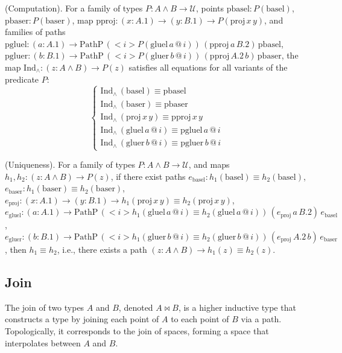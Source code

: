 \begin{theorem} (Computation).
For a family of types \( P : A \wedge B \to \mathcal{U} \),
points \( \text{pbasel} : P(\text{basel}) \),
\( \text{pbaser} : P(\text{baser}) \),
map \( \text{pproj} : (x : A.1) \to (y : B.1) \to P(\text{proj} \, x \, y) \),
and families of paths
\( \text{pgluel} : (a : A.1) \to \text{PathP} \, (<i> P(\text{gluel} \, a \, @ \, i)) \, (\text{pproj} \, a \, B.2) \, \text{pbasel} \),
\( \text{pgluer} : (b : B.1) \to \text{PathP} \, (<i> P(\text{gluer} \, b \, @ \, i)) \, (\text{pproj} \, A.2 \, b) \, \text{pbaser} \),
the map \( \text{Ind}_\wedge : (z : A \wedge B) \to P(z) \) satisfies all equations for all variants
of the predicate \( P \):
\[
\begin{cases}
\text{Ind}_\wedge \, (\text{basel}) \equiv \text{pbasel} \\
\text{Ind}_\wedge \, (\text{baser}) \equiv \text{pbaser} \\
\text{Ind}_\wedge \, (\text{proj} \, x \, y) \equiv \text{pproj} \, x \, y \\
\text{Ind}_\wedge \, (\text{gluel} \, a \, @ \, i) \equiv \text{pgluel} \, a \, @ \, i \\
\text{Ind}_\wedge \, (\text{gluer} \, b \, @ \, i) \equiv \text{pgluer} \, b \, @ \, i
\end{cases}
\]
\end{theorem}

\begin{theorem} (Uniqueness).
For a family of types \( P : A \wedge B \to \mathcal{U} \),
and maps \( h_1, h_2 : (z : A \wedge B) \to P(z) \),
if there exist paths
\( e_{\text{basel}} : h_1(\text{basel}) \equiv h_2(\text{basel}) \),
\( e_{\text{baser}} : h_1(\text{baser}) \equiv h_2(\text{baser}) \),
\( e_{\text{proj}} : (x : A.1) \to (y : B.1) \to h_1(\text{proj} \, x \, y) \equiv h_2(\text{proj} \, x \, y) \),
\( e_{\text{gluel}} : (a : A.1) \to \text{PathP} \, (<i> h_1(\text{gluel} \, a \, @ \, i) \equiv h_2(\text{gluel} \, a \, @ \, i)) \, (e_{\text{proj}} \, a \, B.2) \, e_{\text{basel}} \),
\( e_{\text{gluer}} : (b : B.1) \to \text{PathP} \, (<i> h_1(\text{gluer} \, b \, @ \, i) \equiv h_2(\text{gluer} \, b \, @ \, i)) \, (e_{\text{proj}} \, A.2 \, b) \, e_{\text{baser}} \),
then \( h_1 \equiv h_2 \), i.e., there exists a path \( (z : A \wedge B) \to h_1(z) \equiv h_2(z) \).
\end{theorem}

\newpage
\subsection{Join}
The join of two types \( A \) and \( B \), denoted \( A \Join B \),
is a higher inductive type that constructs a type by
joining each point of \( A \) to each point of \( B \) via a path.
Topologically, it corresponds to the join of spaces, forming
a space that interpolates between \( A \) and \( B \).

